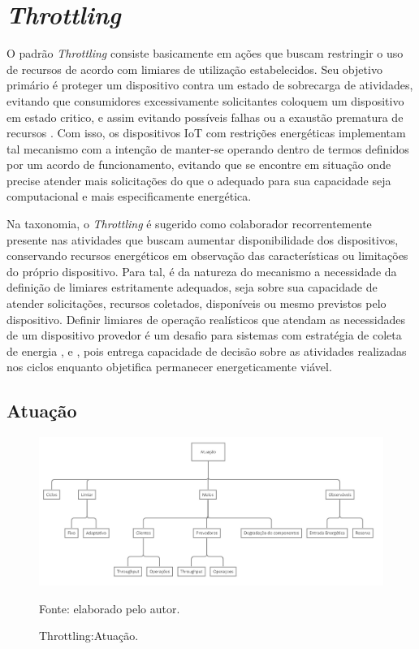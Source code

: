 \section{\textit{Throttling}}

O padrão \textit{Throttling} consiste basicamente em ações que buscam restringir o uso de recursos de acordo com limiares de utilização estabelecidos. Seu objetivo primário é proteger um dispositivo contra um estado de sobrecarga de atividades, evitando que consumidores excessivamente solicitantes coloquem um dispositivo em estado critico, e assim evitando possíveis falhas ou a exaustão prematura de recursos \cite{martinekuan_throttling_nodate}. Com isso, os dispositivos \acs{IoT} com restrições energéticas implementam tal mecanismo com a intenção de manter-se operando dentro de termos definidos por um acordo de funcionamento, evitando que se encontre em situação onde precise atender mais solicitações do que o adequado para sua capacidade seja computacional e mais especificamente energética.

Na taxonomia, o \textit{Throttling} é sugerido como colaborador recorrentemente presente nas atividades que buscam aumentar disponibilidade dos dispositivos, conservando recursos energéticos em observação das características ou limitações do próprio dispositivo. Para tal, é da natureza do mecanismo a necessidade da definição de limiares estritamente adequados, seja sobre sua capacidade de atender solicitações, recursos coletados, disponíveis ou mesmo previstos pelo dispositivo. Definir limiares de operação realísticos que atendam as necessidades de um dispositivo provedor é um desafio para sistemas com estratégia de coleta de energia \cite{khairnar_discrete-rate_2015}, \cite{liu_energy_2016} e \cite{zhang_toward_2018}, pois entrega capacidade de decisão sobre as atividades realizadas nos ciclos enquanto objetifica permanecer energeticamente viável.

\subsection{Atuação}
\label{cap4:atuação}

\begin{figure}[hbt]
	\centering
	\caption{Throttling:Atuação.}
	\label{fig:taxonomia_atuacao}
	\includegraphics[width=1\textwidth]{Imagens/cap4/cap4taxonomia_throttling_atuacao.jpg}	
	
	Fonte: elaborado pelo autor.
\end{figure}


